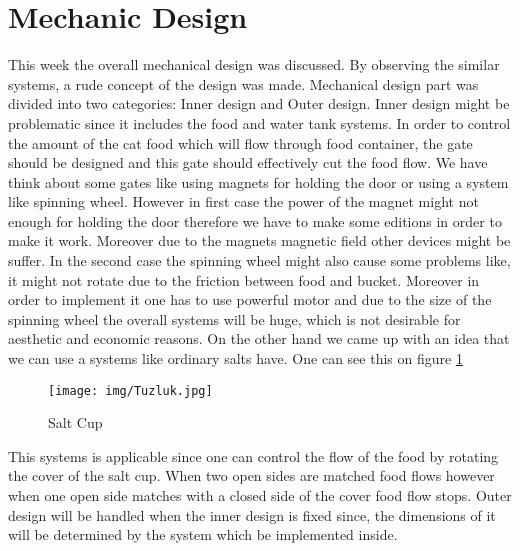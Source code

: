 \section{Mechanic Design} \label{sec:mechanic}
This week the overall mechanical design was discussed. By observing the similar systems, a rude concept of the design was made.  Mechanical design part was divided into two categories: Inner design and Outer design.
Inner design might be problematic since it includes the food and water tank systems. In order to control the amount of the cat food which will flow through food container, the gate should be designed and this gate should effectively cut the food flow. We have think about some gates like using magnets for holding the door or using a system like spinning wheel. However in first case the power of the magnet might not enough for holding the door therefore we have to make some editions in order to make it work. Moreover due to the magnets magnetic field other devices might be suffer. In the second case the spinning wheel might also cause some problems like, it might not rotate due to the friction between food and bucket. Moreover in order to implement it one has to use powerful motor and due to the size of the spinning wheel the overall systems will be huge, which is not desirable for aesthetic and economic reasons. On the other hand we came up with an idea that we can use a systems like ordinary salts have. One can see this on figure \ref{fig:tuzluk}

\begin{figure}
    \centering
    \texttt{[image: img/Tuzluk.jpg]}
    \caption{Salt Cup}
    \label{fig:tuzluk}
\end{figure}

This systems is applicable since one can control the flow of the food by rotating the cover of the salt cup. When two open sides are matched food flows however when one open side matches with a closed side of the cover food flow stops.
Outer design will be handled when the inner design is fixed since, the dimensions of it will be determined by the system which be implemented inside.
